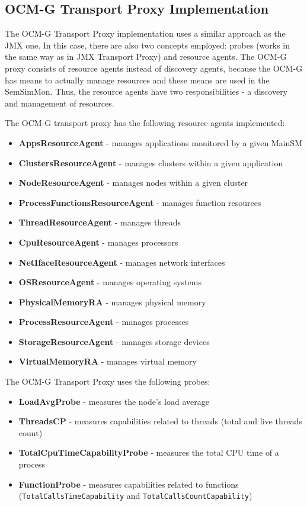 \subsection{OCM-G Transport Proxy Implementation}

The OCM-G Transport Proxy implementation uses a similar approach as the JMX one. In this case, there are also two concepts employed: probes (works in the same way as in JMX Transport Proxy) and resource agents. The OCM-G proxy consists of resource agents instead of discovery agents, because the OCM-G has means to actually manage resources and these means are used in the SemSimMon. Thus, the resource agents have two responsibilities - a discovery and management of resources.

The OCM-G transport proxy has the following resource agents implemented:

\begin{itemize} 
  \item{\bf{AppsResourceAgent}} - manages applications monitored by a given MainSM
  \item{\bf{ClustersResourceAgent}} - manages clusters within a given application
  \item{\bf{NodeResourceAgent}} - manages nodes within a given cluster
  \item{\bf{ProcessFunctionsResourceAgent}} - manages function resources
  \item{\bf{ThreadResourceAgent}} - manages threads
  \item{\bf{CpuResourceAgent}} - manages processors
  \item{\bf{NetIfaceResourceAgent}} - manages network interfaces
  \item{\bf{OSResourceAgent}} - manages operating systems
  \item{\bf{PhysicalMemoryRA}} - manages physical memory
  \item{\bf{ProcessResourceAgent}} - manages processes
  \item{\bf{StorageResourceAgent}} - manages storage devices
  \item{\bf{VirtualMemoryRA}} - manages virtual memory
 \end{itemize} 
  
The OCM-G Transport Proxy uses the following probes:

\begin{itemize} 
  \item{\bf{LoadAvgProbe}} - measures the node\rq{}s load average 
  \item{\bf{ThreadsCP}} - measures capabilities related to threads (total and live threads count)
  \item{\bf{TotalCpuTimeCapabilityProbe}} - measures the total CPU time of a process
  \item{\bf{FunctionProbe}} - measures capabilities related to functions (\texttt{TotalCallsTimeCapability} and \texttt{TotalCallsCountCapability})
\end{itemize} 

